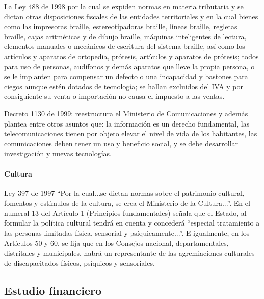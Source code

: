 \documentclass[a4paper, 12pt, oneside]{article}
\begin{document}
	La Ley 488 de 1998 por la cual se expiden normas en materia tributaria y se dictan otras disposiciones fiscales de las entidades territoriales y en la cual bienes como las impresoras braille, estereotipadoras braille, líneas braille, regletas braille, cajas aritméticas y de dibujo braille, máquinas inteligentes de lectura, elementos manuales o mecánicos de escritura del sistema braille, así como los artículos y aparatos de ortopedia, prótesis, artículos y aparatos de prótesis; todos para uso de personas, audífonos y demás aparatos que lleve la propia persona, o se le implanten para compensar un defecto o una incapacidad y bastones para ciegos aunque estén dotados de tecnología; se hallan excluidos del IVA y por consiguiente su venta o importación no causa el impuesto a las ventas. 

	Decreto 1130 de 1999: reestructura el Ministerio de Comunicaciones y además plantea entre otros asuntos que: la información es un derecho fundamental, las telecomunicaciones tienen por objeto elevar el nivel de vida de los habitantes, las comunicaciones deben tener un uso y beneficio social, y se debe desarrollar investigación y nuevas tecnologías.

	\paragraph{Cultura}

	Ley 397 de 1997 “Por la cual...se dictan normas sobre el patrimonio cultural, fomentos y estímulos de la cultura, se crea el Ministerio de la Cultura...”. En el numeral 13 del Artículo 1 (Principios fundamentales) señala que el Estado, al formular la política cultural tendrá en cuenta y concederá “especial tratamiento a las personas limitadas física, sensorial y psíquicamente...”. E igualmente, en los Artículos 50 y 60, se fija que en los Consejos nacional, departamentales, distritales y municipales, habrá un representante de las agremiaciones culturales de discapacitados físicos, psíquicos y sensoriales.	
	\clearpage
	
	\begin{center}
	\section{Estudio financiero}
	\end{center}
	
\end{document}
